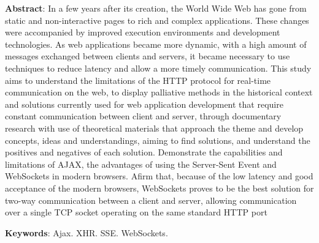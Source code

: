 {
	\small
	\noindent
	
	\textbf{Abstract}:
	In a few years after its creation, the World Wide Web has gone from static and non-interactive pages to rich and complex applications. These changes were accompanied by improved execution environments and development technologies. As web applications became more dynamic, with a high amount of messages exchanged between clients and servers, it became necessary to use techniques to reduce latency and allow a more timely communication. This study aims to understand the limitations of the HTTP protocol for real-time communication on the web, to display palliative methods in the historical context and solutions currently used for web application development that require constant communication between client and server, through documentary research with use of theoretical materials that approach the theme and develop concepts, ideas and understandings, aiming to find solutions, and understand the positives and negatives of each solution. Demonstrate the capabilities and limitations of AJAX, the advantages of using the Server-Sent Event and WebSockets in modern browsers. Afirm that, because of the low latency and good acceptance of the modern browsers, WebSockets proves to be the best solution for two-way communication between a client and server, allowing communication over a single TCP socket operating on the same standard HTTP port
	
	\vspace{\onelineskip}
	
	\textbf{Keywords}: Ajax. XHR. SSE. WebSockets.
}